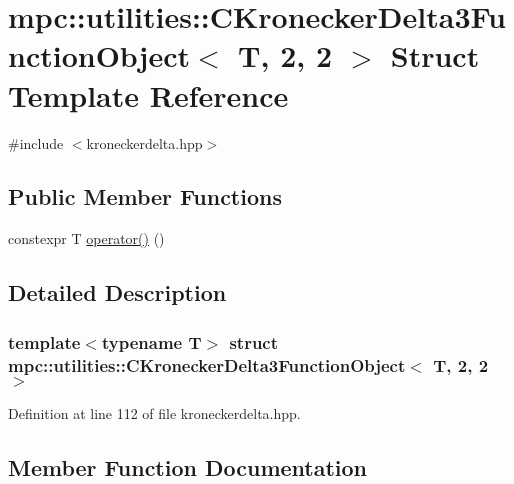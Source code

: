 \hypertarget{structmpc_1_1utilities_1_1_c_kronecker_delta3_function_object_3_01_t_00_012_00_012_01_4}{}\section{mpc\+:\+:utilities\+:\+:C\+Kronecker\+Delta3\+Function\+Object$<$ T, 2, 2 $>$ Struct Template Reference}
\label{structmpc_1_1utilities_1_1_c_kronecker_delta3_function_object_3_01_t_00_012_00_012_01_4}


{\ttfamily \#include $<$kroneckerdelta.\+hpp$>$}

\subsection*{Public Member Functions}
\begin{DoxyCompactItemize}
\item 
constexpr T \mbox{\hyperlink{structmpc_1_1utilities_1_1_c_kronecker_delta3_function_object_3_01_t_00_012_00_012_01_4_abc8413b7e4fbdae2d997254944128449}{operator()}} ()
\end{DoxyCompactItemize}


\subsection{Detailed Description}
\subsubsection*{template$<$typename T$>$\newline
struct mpc\+::utilities\+::\+C\+Kronecker\+Delta3\+Function\+Object$<$ T, 2, 2 $>$}



Definition at line 112 of file kroneckerdelta.\+hpp.



\subsection{Member Function Documentation}
\mbox{\label{structmpc_1_1utilities_1_1_c_kronecker_delta3_function_object_3_01_t_00_012_00_012_01_4_abc8413b7e4fbdae2d997254944128449}} 
